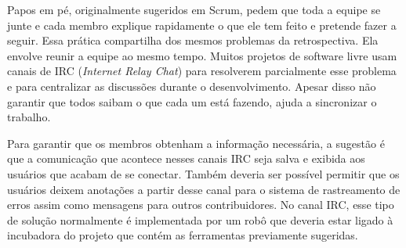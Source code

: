 Papos em pé, originalmente sugeridos em Scrum, pedem que toda a equipe
se junte e cada membro explique rapidamente o que ele tem feito e
pretende fazer a seguir. Essa prática compartilha dos mesmos problemas
da retrospectiva. Ela envolve reunir a equipe ao mesmo tempo. Muitos
projetos de software livre usam canais de IRC (\emph{Internet Relay
  Chat}) para resolverem parcialmente esse problema e para centralizar
as discussões durante o desenvolvimento. Apesar disso não garantir que
todos saibam o que cada um está fazendo, ajuda a sincronizar o
trabalho.

Para garantir que os membros obtenham a informação necessária, a
sugestão é que a comunicação que acontece nesses canais IRC seja salva
e exibida aos usuários que acabam de se conectar. Também deveria ser
possível permitir que os usuários deixem anotações a partir desse
canal para o sistema de rastreamento de erros assim como mensagens
para outros contribuidores. No canal IRC, esse tipo de solução
normalmente é implementada por um robô que deveria estar ligado à
incubadora do projeto que contém as ferramentas previamente sugeridas.
